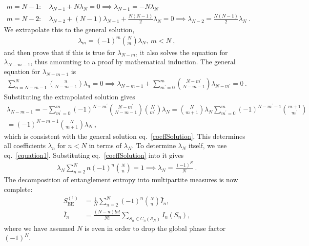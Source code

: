 \begin{equation}\begin{aligned}
	m=N-1:~&\lambda_{N-1} + N\lambda_{N} = 0 \implies \lambda_{N-1} = -N \lambda_N\\
	m=N-2:~&\lambda_{N-2} + \left(N-1\right) \lambda_{N-1} + \frac{N(N-1)}{2}\lambda_{N} = 0 \implies \lambda_{N-2} = \frac{N(N-1)}{2}\lambda_N~.
\end{aligned}\end{equation}
We extrapolate this to the general solution,
\begin{equation}\begin{aligned}\label{coeffSolution}
	\lambda_{m} = (-1)^m \binom{N}{m} \lambda_N,~m < N~,
\end{aligned}\end{equation}
and then prove that if this is true for \(\lambda_{N-m}\), it also solves the equation for \(\lambda_{N-m-1}\), thus amounting to a proof by mathematical induction. The general equation for \(\lambda_{N-m-1}\) is
\begin{equation}\begin{aligned}
	\sum_{n=N-m-1}^N \binom{n}{N-m-1} \lambda_n = 0 \implies \lambda_{N-m-1} + \sum_{m^\prime=0}^{m}\binom{N-m^\prime}{N-m-1} \lambda_{N-m^\prime} = 0~.
\end{aligned}\end{equation}
Substituting the extrapolated solution gives
\begin{equation}\begin{aligned}
	\lambda_{N-m-1} = -\sum_{m^\prime=0}^{m} (-1)^{N - m^\prime}\binom{N-m^\prime}{N-m-1} \binom{N}{m^\prime} \lambda_N = \binom{N}{m+1} \lambda_N\sum_{m^\prime=0}^{m} (-1)^{N - m^\prime - 1}\binom{m+1}{m^\prime} \\
	= (-1)^{N - m - 1}\binom{N}{m+1} \lambda_N~,
\end{aligned}\end{equation}
which is consistent with the general solution eq.~\ref{coeffSolution}. This determines all coefficients \(\lambda_n\) for \(n < N\) in terms of \(\lambda_N\). To determine \(\lambda_N\) itself, we use eq.~\ref{equation1}. Substituting eq.~\ref{coeffSolution} into it gives
\begin{equation}\begin{aligned}\label{finalCoeff}
	\lambda_N \sum_{n=2}^N n (-1)^{n} \binom{N}{n} = 1 \implies \lambda_N =  \frac{(-1)^N}{N}~.
\end{aligned}\end{equation}
The decomposition of entanglement entropy into multipartite measures is now complete:
\begin{equation}\begin{aligned}
	S_\text{EE}^{(1)} &= \frac{1}{N}\sum_{n=2}^N (-1)^{n} \binom{N}{n} \bar I_n,\\
	\bar I_n &= \frac{(N-n)! n!}{N!}\sum_{S_n \in C_n(\mathcal{S}_N)} I_n(S_n),
\end{aligned}\end{equation}
where we have assumed \(N\) is even in order to drop the global phase factor \((-1)^N\).

